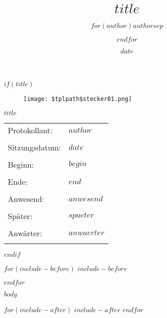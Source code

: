 \documentclass[a4paper,12pt,ngerman,titlepage,oneside]{$documentclass$}
\title{$title$}
\author{$for(author)$$author$$sep$ \and $endfor$}
\date{$date$}
\begin{document}
$if(title)$
	\thispagestyle{empty}
	\begin{titlepage}
		\thispagestyle{empty}
		\normalfont

        \vfill
        \begin{figure}[ht]
	       \centering
           \texttt{[image: \$tplpath\$stecker01.png]}
	       \label{fig_stecker}
        \end{figure}
        \vfill
		\begin{center}
			\LARGE
			\textbf{$title$}
            \par
		\end{center}
		\vfill

		\begin{table}[htb]
		\begin{tabular}{lp{10cm}}
			Protokollant: & $author$\\\\
            Sitzungsdatum: & $date$\\\\
            Beginn: & $begin$\\\\
            Ende: & $end$\\\\
            Anwesend: & $anwesend$\\\\
            Später: & $spaeter$\\\\
            Anwärter: & $anwaerter$\\\\
		\end{tabular}
		\end{table}

	\vfill
\end{titlepage}
\clearpage
$endif$

$for(include-before)$
$include-before$

$endfor$

{
\hypersetup{linkcolor=black}
\setcounter{tocdepth}{$toc-depth$}
\tableofcontents
\clearpage
}

$body$

$for(include-after)$
$include-after$
$endfor$
\end{document}

